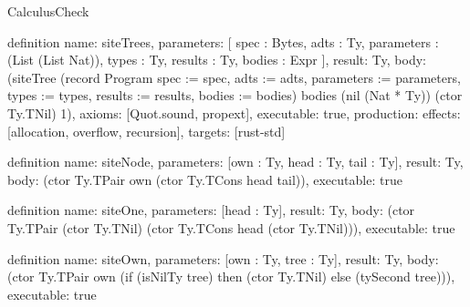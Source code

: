 \begin{lexlean}{CalculusCheck}
\begin{semanticmodule}
definition{
  name: siteTrees,
  parameters: [
    spec : Bytes,
    adts : Ty,
    parameters : (List (List Nat)),
    types : Ty,
    results : Ty,
    bodies : Expr
  ],
  result: Ty,
  body: (siteTree (record Program {spec := spec, adts := adts, parameters := parameters, types := types, results := results, bodies := bodies}) bodies (nil (Nat * Ty)) (ctor Ty.TNil) 1),
  axioms: [Quot.sound, propext],
  executable: true,
  production: {effects: [allocation, overflow, recursion], targets: [rust-std]}
}

definition{
  name: siteNode,
  parameters: [own : Ty, head : Ty, tail : Ty],
  result: Ty,
  body: (ctor Ty.TPair own (ctor Ty.TCons head tail)),
  executable: true
}

definition{
  name: siteOne,
  parameters: [head : Ty],
  result: Ty,
  body: (ctor Ty.TPair (ctor Ty.TNil) (ctor Ty.TCons head (ctor Ty.TNil))),
  executable: true
}

definition{
  name: siteOwn,
  parameters: [own : Ty, tree : Ty],
  result: Ty,
  body: (ctor Ty.TPair own (if (isNilTy tree) then (ctor Ty.TNil) else (tySecond tree))),
  executable: true
}


\end{semanticmodule}
\end{lexlean}
